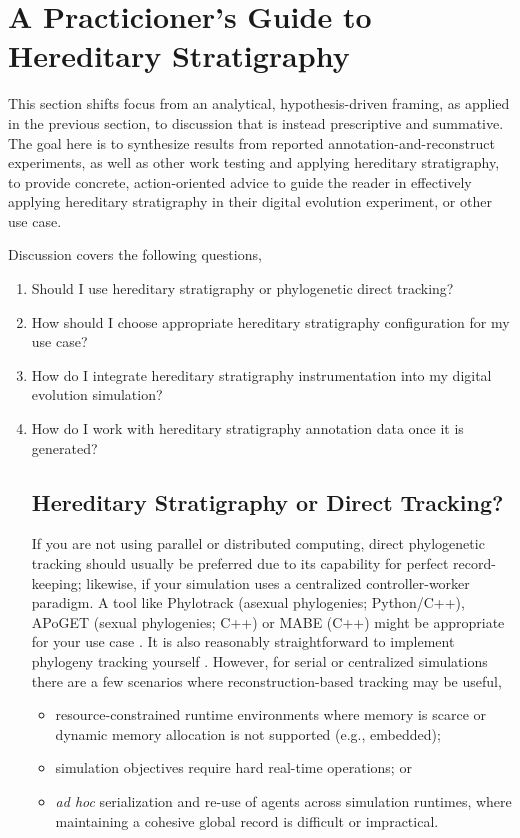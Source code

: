 \section{A Practicioner's Guide to Hereditary Stratigraphy} \label{sec:synthesis}

This section shifts focus from an analytical, hypothesis-driven framing, as applied in the previous section, to discussion that is instead prescriptive and summative.
The goal here is to synthesize results from reported annotation-and-reconstruct experiments, as well as other work testing and applying hereditary stratigraphy, to provide concrete, action-oriented advice to guide the reader in effectively applying hereditary stratigraphy in their digital evolution experiment, or other use case.

Discussion covers the following questions,
\begin{enumerate}
\item Should I use hereditary stratigraphy or phylogenetic direct tracking?
\item How should I choose appropriate hereditary stratigraphy configuration for my use case?
\item How do I integrate hereditary stratigraphy instrumentation into my digital evolution simulation?
\item How do I work with hereditary stratigraphy annotation data once it is generated?

\subsection{Hereditary Stratigraphy or Direct Tracking?}

If you are not using parallel or distributed computing, direct phylogenetic tracking should usually be preferred due to its capability for perfect record-keeping; likewise, if your simulation uses a centralized controller-worker paradigm.
A tool like Phylotrack (asexual phylogenies; Python/C++), APoGET (sexual phylogenies; C++) or MABE (C++) might be appropriate for your use case \citep{dolson2024phylotrack,bohm2017modular}.
It is also reasonably straightforward to implement phylogeny tracking yourself \citep{moreno2024algorithms}.
However, for serial or centralized simulations there are a few scenarios where reconstruction-based tracking may be useful,
\begin{itemize}
\item resource-constrained runtime environments where memory is scarce or dynamic memory allocation is not supported (e.g., embedded);
\item simulation objectives require hard real-time operations; or
\item \textit{ad hoc} serialization and re-use of agents across simulation runtimes, where maintaining a cohesive global record is difficult or impractical.
\end{itemize}


\end{enumerate}
